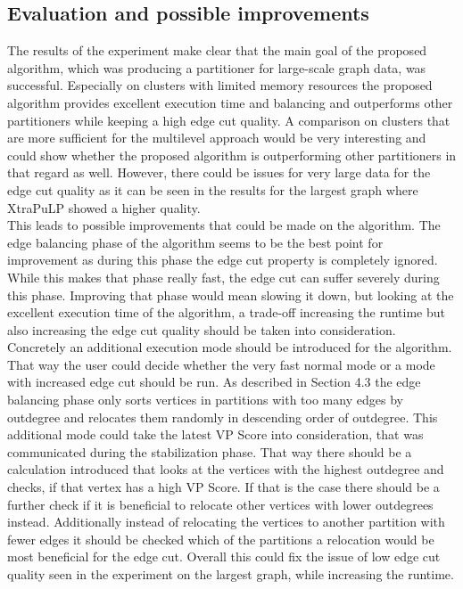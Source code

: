 \documentclass[acmsmall,nonacm,screen,review]{acmart}
\begin{document}
\subsection{Evaluation and possible improvements}
The results of the experiment make clear that the main goal of the proposed algorithm, which was producing a partitioner for large-scale graph data, was successful. Especially on clusters with limited memory resources the proposed algorithm provides excellent execution time and balancing and outperforms other partitioners while keeping a high edge cut quality. A comparison on clusters that are more sufficient for the multilevel approach would be very interesting and could show whether the proposed algorithm is outperforming other partitioners in that regard as well. However, there could be issues for very large data for the edge cut quality as it can be seen in the results for the largest graph where XtraPuLP showed a higher quality.\\
This leads to possible improvements that could be made on the algorithm. The edge balancing phase of the algorithm seems to be the best point for improvement as during this phase the edge cut property is completely ignored. While this makes that phase really fast, the edge cut can suffer severely during this phase. Improving that phase would mean slowing it down, but looking at the excellent execution time of the algorithm, a trade-off increasing the runtime but also increasing the edge cut quality should be taken into consideration.\\
Concretely an additional execution mode should be introduced for the algorithm. That way the user could decide whether the very fast normal mode or a mode with increased edge cut should be run. As described in Section 4.3 the edge balancing phase only sorts vertices in partitions with too many edges by outdegree and relocates them randomly in descending order of outdegree. This additional mode could take the latest VP Score into consideration, that was communicated during the stabilization phase. That way there should be a calculation introduced that looks at the vertices with the highest outdegree and checks, if that vertex has a high VP Score. If that is the case there should be a further check if it is beneficial to relocate other vertices with lower outdegrees instead. Additionally instead of relocating the vertices to another partition with fewer edges it should be checked which of the partitions a relocation would be most beneficial for the edge cut. Overall this could fix the issue of low edge cut quality seen in the experiment on the largest graph, while increasing the runtime.  
\end{document}
